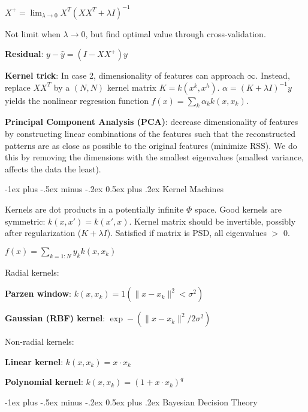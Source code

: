 \documentclass[10pt,landscape]{article}
\makeatletter
\renewcommand{\section}{\@startsection{section}{1}{0mm}%
                                {-1ex plus -.5ex minus -.2ex}%
                                {0.5ex plus .2ex}%
                                {\normalfont\large\bfseries}}
\makeatother
\begin{document}
\begin{multicols}{3}
$X^+ = \lim_{\lambda \rightarrow 0} X^T(XX^T + \lambda I)^{-1}$

Not limit when $\lambda \rightarrow 0$, but find optimal value through cross-validation.

\textbf{Residual}: $y-\hat{y} = (I-XX^+)y$

\textbf{Kernel trick}: In case 2, dimensionality of features can approach $\infty$. Instead, replace $XX^T$ by a $(N, N)$ kernel matrix $K = k(x^k, x^h)$. $\alpha = (K + \lambda I)^{-1} y$ yields the nonlinear regression function $f(x) = \sum_k \alpha_k k(x, x_k)$.

\textbf{Principal Component Analysis (PCA)}: decrease dimensionality of features by constructing linear combinations of the features such that the reconstructed patterns are as close as possible to the original features (minimize RSS). We do this by removing the dimensions with the smallest eigenvalues (smallest variance, affects the data the least).


\section{Kernel Machines}

Kernels are dot products in a potentially infinite $\Phi$ space.
Good kernels are symmetric: $k(x, x') = k(x', x)$.
Kernel matrix should be invertible, possibly after regularization ($K+\lambda I$). Satisfied if matrix is PSD, all eigenvalues $>$ 0.

$f(x) = \sum_{k=1:N} y_k k(x, x_k)$

Radial kernels:

\textbf{Parzen window}: $k(x, x_k) = 1(\lVert x - x_k \rVert^2 < \sigma^2)$

\textbf{Gaussian (RBF) kernel}: $\exp -(\lVert x - x_k \rVert^2 / 2\sigma^2)$

Non-radial kernels:

\textbf{Linear kernel}: $k(x, x_k) = x \cdot x_k$

\textbf{Polynomial kernel}: $k(x, x_k) = (1 + x \cdot x_k)^q$


\section{Bayesian Decision Theory}


\end{multicols}
\end{document}

